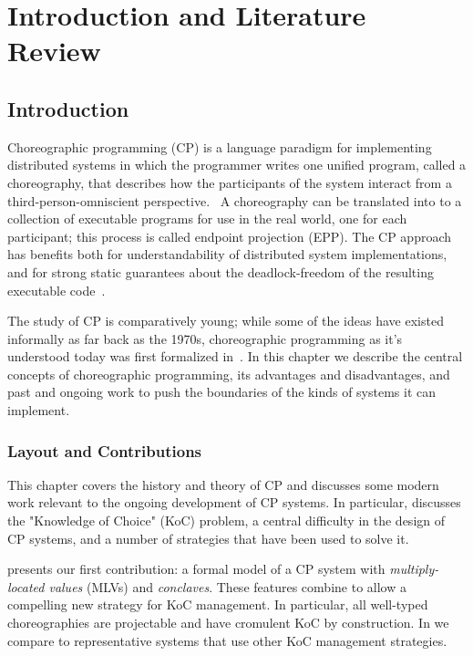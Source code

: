 \chapter{Introduction and Literature Review}

\section{Introduction}
\label{sec:introduction}

Choreographic programming (CP)
is a language paradigm for implementing distributed systems in which the programmer writes one unified program, called a choreography,
that describes how the participants of the system interact
from a third-person-omniscient perspective.~
A choreography can be translated into to a collection of executable programs for use in the real world, one for each participant;
this process is called endpoint projection (EPP).
The CP approach has benefits both for understandability of distributed system implementations,
and for strong static guarantees about the deadlock-freedom of the resulting executable code~\cite{montesi-carbone-dfbd}.

The study of CP is comparatively young; while some of the ideas have existed informally as far back as the 1970s,
choreographic programming as it's understood today was first formalized in~.
In this chapter we describe the central concepts of choreographic programming,
its advantages and disadvantages,
and past and ongoing work to push the boundaries of the kinds of systems it can implement.

\subsection{Layout and Contributions}

This chapter covers the history and theory of CP
and discusses some modern work relevant to the ongoing development of CP systems.
In particular,  discusses the "Knowledge of Choice" (KoC) problem,
a central difficulty in the design of CP systems,
and a number of strategies that have been used to solve it.

 presents our first contribution:
a formal model of a CP system with
\emph{multiply-located values} (MLVs)
and \emph{conclaves}.
These features combine to allow a compelling new strategy for KoC management.
In particular, all well-typed \HLSCentral choreographies are projectable and have cromulent KoC by construction.
In  we compare \HLSCentral to representative systems that use other KoC management strategies.

